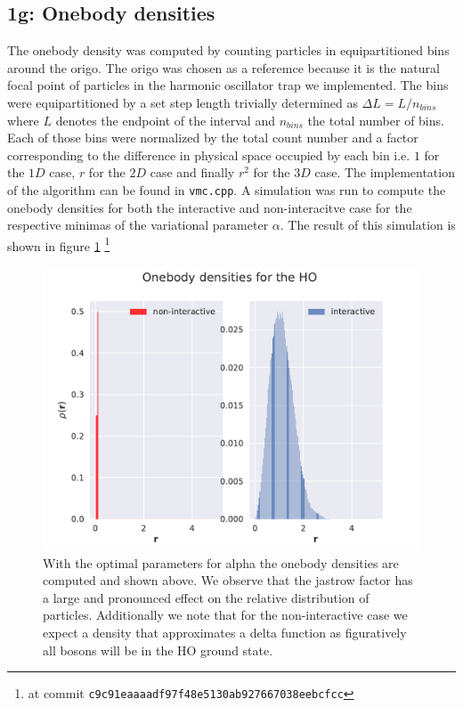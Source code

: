\subsection*{\textbf{1g:} Onebody densities}

The onebody density was computed by counting particles in equipartitioned bins around the origo. The origo was chosen as a referemce because it is the natural focal point of particles in the harmonic oscillator trap we implemented. The bins were equipartitioned by a set step length trivially determined as $\Delta L = L/n_{bins}$ where $L$ denotes the endpoint of the interval and $n_{bins}$ the total number of bins. Each of those bins were normalized by the total count number and a factor corresponding to the difference in physical space occupied by each bin i.e. $1$ for the $1D$ case, $r$ for the $2D$ case and finally $r^2$ for the $3D$ case. The implementation of the algorithm can be found in \lstinline{vmc.cpp}. A simulation was run to compute the onebody densities for both the interactive and non-interacitve case for the respective minimas of the variational parameter $\alpha$. The result of this simulation is shown in figure \ref{fig:obd_i_ni} \footnote{at commit \lstinline{c9c91eaaaadf97f48e5130ab927667038eebcfcc}} 

\begin{figure}
\includegraphics{figures/obd_i_ni.pdf}
\caption{With the optimal parameters for alpha the onebody densities are computed and shown above. We observe that the jastrow factor has a large and pronounced effect on the relative distribution of particles. Additionally we note that for the non-interactive case we expect a density that approximates a delta function as figuratively all bosons will be in the HO ground state.}\label{fig:obd_i_ni}
\end{figure} 
